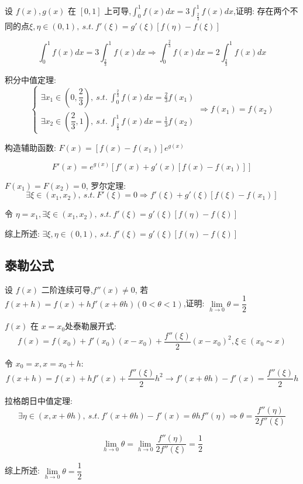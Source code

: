 \begin{proposition}
	设 $f(x),g(x)$ 在 $[0,1]$ 上可导,$\displaystyle{\int_{0}^{1}f(x)dx=3\int_{\frac{2}{3}}^{1}f(x)dx}$,证明: 存在两个不同的点$\xi,\eta\in(0,1),\ s.t.\ f'(\xi)=g'(\xi)[f(\eta)-f(\xi)]$
\end{proposition}
\begin{solution}

	$$\int_{0}^{1}f(x)dx=3\int_{\frac{2}{3}}^{1}f(x)dx\Rightarrow \int_{0}^{\frac{2}{3}}f(x)dx=2\int_{\frac{2}{3}}^{1}f(x)dx$$

	积分中值定理:
	$$\begin{cases}
		\exists x_{1}\in(0,\dfrac{2}{3}),\ s.t.\ \displaystyle{\int_{0}^{\frac{2}{3}}f(x)dx=\frac{2}{3}f(x_{1})} \\
		\exists x_{2}\in(\dfrac{2}{3},1),\ s.t.\ \displaystyle{\int_{\frac{2}{3}}^{1}f(x)dx=\frac{1}{3}f(x_{2})}
	\end{cases}\Rightarrow f(x_{1})=f(x_{2})$$

	构造辅助函数: $F(x)=[f(x)-f(x_{1})]e^{g(x)}$

	$$F'(x)=e^{g(x)}\left[f'(x)+g'(x)[f(x)-f(x_{1})]\right]$$

	$F(x_{1}) = F(x_{2}) = 0$, 罗尔定理:
	$$\exists \xi\in(x_{1},x_{2}),\ s.t.\ F'(\xi)=0\Rightarrow f'(\xi)+g'(\xi)[f(\xi)-f(x_{1})]$$

	令 $\eta=x_{1},\exists \xi\in(x_{1},x_{2}),\ s.t.\ f'(\xi)=g'(\xi)[f(\eta)-f(\xi)]$

	综上所述: $\exists \xi,\eta\in(0,1),\ s.t.\ f'(\xi)=g'(\xi)[f(\eta)-f(\xi)]$

\end{solution}

\subsection{泰勒公式}

\begin{proposition}
	设 $f(x)$ 二阶连续可导,$f''(x)\neq 0$, 若 $f(x+h)=f(x)+ h f'(x+\theta h)(0<\theta<1)$,证明: $\lim\limits_{h\rightarrow 0 }\theta=\dfrac{1}{2}$
\end{proposition}
\begin{solution}

	$f(x)$ 在 $x = x_{0}$处泰勒展开式:
	$$f(x) = f(x_{0}) + f'(x_{0})(x-x_{0}) + \dfrac{f''(\xi)}{2}(x-x_{0})^{2}, \xi\in(x_{0}\sim x)$$

	令 $x_{0} = x, x = x_{0} + h$:
	$$f(x+h) = f(x) + hf'(x) + \dfrac{f''(\xi)}{2}h^{2}\to f'(x+\theta h) -f'(x) = \dfrac{f''(\xi)}{2}h$$
	
	拉格朗日中值定理:
	$$\exists\eta \in(x,x+\theta h),\ s.t.\ f'(x+\theta h) - f'(x)=\theta hf''(\eta)\Rightarrow \theta=\dfrac{f''(\eta)}{2f''(\xi)}$$

	$$\lim\limits_{h\rightarrow 0 }\theta=\lim\limits_{h\rightarrow 0 }\dfrac{f''(\eta)}{2f''(\xi)}=\dfrac{1}{2}$$

	综上所述: $\lim\limits_{h\rightarrow 0 }\theta=\dfrac{1}{2}$
\end{solution}

